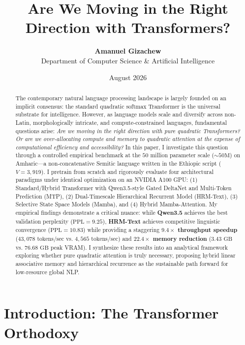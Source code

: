 \documentclass[11pt,a4paper]{article}
\title{\vspace{-0.5in}\textbf{\Large Are We Moving in the Right Direction with Transformers?}}
\author{
  \textbf{Amanuel Gizachew} \\
  Department of Computer Science \& Artificial Intelligence
}
\date{August 2026}
\begin{document}
\maketitle

\begin{abstract}
The contemporary natural language processing landscape is largely founded on an implicit consensus: the standard quadratic softmax Transformer is the universal substrate for intelligence. However, as language models scale and diversify across non-Latin, morphologically intricate, and compute-constrained languages, fundamental questions arise: \textit{Are we moving in the right direction with pure quadratic Transformers? Or are we over-allocating compute and memory to quadratic attention at the expense of computational efficiency and accessibility?} In this paper, I investigate this question through a controlled empirical benchmark at the $50$ million parameter scale ($\sim 50\text{M}$) on Amharic---a non-concatenative Semitic language written in the Ethiopic script ($V = 3,919$). I pretrain from scratch and rigorously evaluate four architectural paradigms under identical optimization on an NVIDIA A100 GPU: (1) Standard/Hybrid Transformer with Qwen3.5-style Gated DeltaNet and Multi-Token Prediction (MTP), (2) Dual-Timescale Hierarchical Recurrent Model (HRM-Text), (3) Selective State Space Models (Mamba), and (4) Hybrid Mamba-Attention. My empirical findings demonstrate a critical nuance: while \textbf{Qwen3.5} achieves the best validation perplexity ($\text{PPL} = 9.25$), \textbf{HRM-Text} achieves competitive linguistic convergence ($\text{PPL} = 10.83$) while providing a staggering \textbf{$9.4\times$ throughput speedup} ($43,078\text{ tokens/sec}$ vs. $4,565\text{ tokens/sec}$) and \textbf{$22.4\times$ memory reduction} ($3.43\text{ GB}$ vs. $76.68\text{ GB}$ peak VRAM). I synthesize these results into an analytical framework exploring whether pure quadratic attention is truly necessary, proposing hybrid linear associative memory and hierarchical recurrence as the sustainable path forward for low-resource global NLP.
\end{abstract}

\section{Introduction: The Transformer Orthodoxy}
\label{sec:intro}
\end{document}
